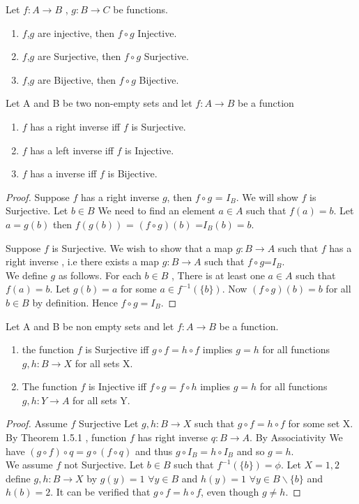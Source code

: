 \documentclass[a4paper,english,12pt]{article}   	%
\begin{document}
\begin{lem}
Let $f \colon A \to B$ , $g \colon B \to C$ be functions.
\begin{enumerate}
\item  $f$,$g$ are injective, then $f \circ g$ Injective.
\item  $f$,$g$ are Surjective, then $f \circ g$ Surjective.
\item  $f$,$g$ are Bijective, then $f \circ g$ Bijective.
\end{enumerate}
\end{lem}
\begin{thm}
Let A and B be two non-empty sets and let $f \colon A \to B$ be a function
\begin{enumerate}
\item $f$ has a right inverse iff $f$ is Surjective.
\item $f$ has a left inverse iff $f$ is Injective.
\item $f$ has a inverse iff $f$ is Bijective.
\end{enumerate}
\end{thm}
\begin{proof} Suppose $f$ has a right inverse $g$, then 
$f \circ g$ = $I_{B}$. We will show $f$ is Surjective.
Let $b \in B$ We need to find an element $a \in A $ such that $f(a)=b$. Let $a=g(b)$ then $f(g(b))$ = $(f \circ g)(b)$ =$I_{B}(b)=b$.
\par
Suppose $f$ is Surjective. We wish to show that a map $g \colon B \to A$ such that $f$ has a right inverse , i.e there exists a map
$g \colon B \to A$ such that $f \circ g$=$I_{B}$.\\
We define $g$ as follows. For each $b \in B$ , There is at least one $a \in A$ such that $f(a)=b$. Let $g(b)=a$ for some $a \in f^{-1}(\{b\})$.
Now $(f \circ g)(b)=b$ for all $b \in B$ by definition. Hence $f \circ g = I_{B}$.

\end{proof} 
\begin{thm} Let A and B be non empty sets and let $f \colon A \to B$ be a function.
\begin{enumerate}
\item the function $f$ is Surjective iff $g \circ f = h \circ f$ implies $g=h$ for all functions $g,h \colon B \to X$ for all sets X.
\item The function $f$ is Injective iff $f \circ g = f \circ h$ implies $g=h$ for all functions $g,h \colon Y \to A$ for all sets Y.
\end{enumerate}
\begin{proof}
Assume $f$ Surjective Let $g,h \colon B \to X$ such that $g \circ f = h \circ f$ for some set X. By Theorem 1.5.1 , function $f$ has right inverse $q \colon B \to A$. By Associativity We have $(g \circ f) \circ q = g \circ (f \circ q) $ and thus $g \circ I_{B} = h \circ I_{B}$ and so $g=h$.\\
We assume $f$ not Surjective. Let $b \in B$ such that $f^{-1}(\{b\})= \phi$. Let $X={1,2}$ define $g,h \colon B \to X$ by $g(y)=1$ $\forall y \in B$ and $h(y)=1$ $ \forall y \in B \backslash \{b\}$ and $h(b)=2$. It can be verified that $g \circ f = h \circ f$, even though $g \neq h$.
\end{proof}
\end{thm}
\end{document}

